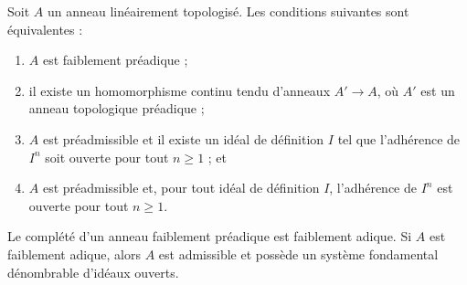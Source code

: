 \begin{lemma}
\label{lemma-weakly-adic}
Soit $A$ un anneau linéairement topologisé. Les conditions suivantes sont équivalentes :
\begin{enumerate}
\item $A$ est faiblement préadique ;
\item il existe un homomorphisme continu tendu d'anneaux $A' \to A$,
où $A'$ est un anneau topologique préadique ;
\item $A$ est préadmissible et il existe un idéal de définition $I$
tel que l'adhérence de $I^n$ soit ouverte pour tout $n \geq 1$ ; et
\item $A$ est préadmissible et, pour tout idéal de définition $I$,
l'adhérence de $I^n$ est ouverte pour tout $n \geq 1$.
\end{enumerate}
Le complété d'un anneau faiblement préadique est faiblement adique.
Si $A$ est faiblement adique, alors $A$ est admissible et possède un système fondamental
dénombrable d'idéaux ouverts.
\end{lemma}

